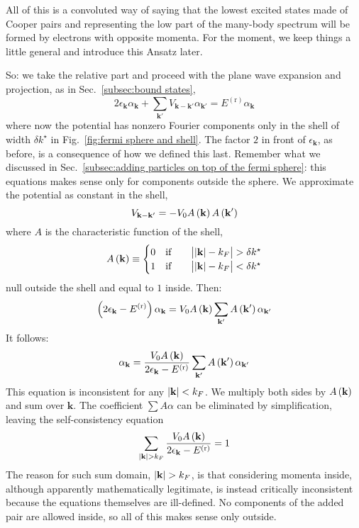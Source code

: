 All of this is a convoluted way of saying that the lowest excited states made of Cooper pairs and representing the low part of the many-body spectrum will be formed by electrons with opposite momenta. For the moment, we keep things a little general and introduce this Ansatz later.

So: we take the relative part and proceed with the plane wave expansion and projection, as in Sec.~\ref{subsec:bound states},
\[
	2 \epsilon_\mathbf{k} \alpha_\mathbf{k} + \sum_{\mathbf{k}'} V_{\mathbf{k}-\mathbf{k}'} \alpha_{\mathbf{k}'} = E^{(\mathrm{r})} \alpha_\mathbf{k}
\]
where now the potential has nonzero Fourier components only in the shell of width $\delta k^\star$ in Fig.~\ref{fig:fermi sphere and shell}. The factor $2$ in front of $\epsilon_\mathbf{k}$, as before, is a consequence of how we defined this last. Remember what we discussed in Sec.~\ref{subsec:adding particles on top of the fermi sphere}: this equations makes sense only for components outside the sphere.
We approximate the potential as constant in the shell,
\[
	V_{\mathbf{k}-\mathbf{k}'} = - V_0 A\left({\mathbf{k}}\right) A\left({\mathbf{k}'}\right)
\]
where $A$ is the characteristic function of the shell,
\[
	A\lrR{\mathbf{k}} \equiv \begin{cases}
		0 \qq{if} &\abs{\abs{\mathbf{k}}-k_F \vphantom{A^A}} > \delta k^\star \\
		1 \qq{if} &\abs{\abs{\mathbf{k}}-k_F \vphantom{A^A}} < \delta k^\star	\end{cases}
\]
null outside the shell and equal to $1$ inside. Then:
\[
	\left({2 \epsilon_\mathbf{k} - E^{(\mathrm{r})}}\right) \alpha_\mathbf{k} = V_0 A\left({\mathbf{k}}\right) \sum_{\mathbf{k}'} A\left({\mathbf{k}'}\right) \alpha_{\mathbf{k}'}
\]
It follows:
\[
	\alpha_\mathbf{k} = \frac{V_0 A\left({\mathbf{k}}\right)}{2 \epsilon_\mathbf{k} - E^{(\mathrm{r})}} \sum_{\mathbf{k}'} A\left({\mathbf{k}'}\right) \alpha_{\mathbf{k}'}
\]
This equation is inconsistent for any $\abs{\mathbf{k}}<k_F$.
We multiply both sides by $A\left({\mathbf{k}}\right)$ and sum over $\mathbf{k}$. The coefficient $\sum A \alpha$ can be eliminated by simplification, leaving the self-consistency equation
\[
	\sum_{\abs{\mathbf{k}}>k_F} \frac{V_0 A\left({\mathbf{k}}\right)}{2 \epsilon_\mathbf{k} - E^{(\mathrm{r})}} = 1
\]
The reason for such sum domain, $\abs{\mathbf{k}}>k_F$, is that considering momenta inside, although apparently mathematically legitimate, is instead critically inconsistent because the equations themselves are ill-defined. No components of the added pair are allowed inside, so all of this makes sense only outside.

